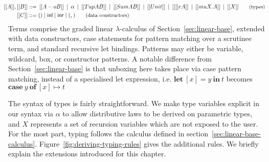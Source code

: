 \begin{align*}
   \hspace{-0.9em}
   [[ A ]], [[ B ]] ::= & \;
   \hspace{0.2em}[[ A -o B ]]
   \hspace{0.2em}\mid \hspace{0.2em} \alpha
   \hspace{0.2em}\mid \hspace{0.2em} [[ Tup A B ]]
   \hspace{0.2em}\mid \hspace{0.2em} [[ Sum A B ]]
   \hspace{0.2em}\mid \hspace{0.2em} [[ Unit ]]
   \hspace{0.2em} \mid \hspace{0.2em} [[ [] r A ]]
   \hspace{0.2em}\mid \hspace{0.2em} [[ mu X . A ]]
   \hspace{0.2em}\mid \hspace{0.2em} [[ X ]]
 {\small{\tag{types}}} \\
 \hspace{-0.9em}
   [[ C ]] ::= & \; () \mid \mathsf{inl} \mid \mathsf{inr}
                 \mid (,)
 {\small{\tag{data constructors}}}
 \end{align*}
Terms comprise the graded linear $\lambda$-calculus of
Section~\ref{sec:linear-base}, extended with data constructors, case statements
for pattern matching over a scrutinee term, and standard recursive let bindings.
Patterns may either be variable, wildcard, box, or constructor patterns. 
A notable difference from Section~\ref{sec:linear-base} is that unboxing here
takes place via case pattern matching, instead of a specialised let expression, i.e.
$\textbf{let}\ [x] = y\ \textbf{in}\ t$ becomes $\textbf{case}\ y\ \textbf{of}\ [x] \mapsto t$
%

The syntax of types is fairly straightforward. We make type variables explicit
in our syntax via $\alpha$ to allow distributive laws to be derived on
parametric types, and $X$ represents a set of recursion variables which are not
exposed to the user. For the most part, typing follows the calculus defined in
section~\ref{sec:linear-base-calculus}. Figure~\ref{fig:deriving-typing-rules}
gives the additional rules. We briefly explain the extensions introduced for
this chapter.

